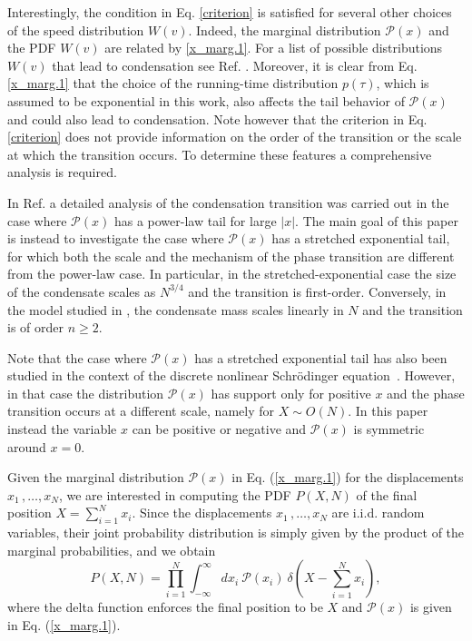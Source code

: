 \documentclass[aps,pre,twocolumn,superscriptaddress,showpacs]{revtex4-1}
\newcommand{\be}{\begin{equation}}
\newcommand{\ee}{\end{equation}}
\newcommand{\mP}{\mathcal{P}}
\begin{document}
Interestingly, the condition in Eq. \eqref{criterion} is satisfied for several other choices of the speed distribution $W(v)$. Indeed, the marginal distribution $\mP(x)$ and the PDF $W(v)$ are related by \eqref{x_marg.1}. For a list of possible distributions $W(v)$ that lead to condensation see Ref. \cite{MLDM21}. Moreover, it is clear from Eq. \eqref{x_marg.1} that the choice of the running-time distribution $p(\tau)$, which is assumed to be exponential in this work, also affects the tail behavior of $\mP(x)$ and could also lead to condensation. Note however that the criterion in Eq. \eqref{criterion} does not provide information on the order of the transition or the scale at which the transition occurs. To determine these features a comprehensive analysis is required.

In Ref. \cite{MLDM21} a detailed analysis of the condensation transition was carried out in the case where $\mP(x)$ has a power-law tail for large $|x|$. The main goal of this paper is instead to investigate the case where $\mP(x)$ has a stretched exponential tail, for which both the scale and the mechanism of the phase transition are different from the power-law case. In particular, in the stretched-exponential case the size of the condensate scales as $N^{3/4}$ and the transition is first-order. Conversely, in the model studied in \cite{MLDM21}, the condensate mass scales linearly in $N$ and the transition is of order $n\geq 2$.



Note that the case where $\mP(x)$ has a stretched exponential tail has also been studied in the context of the discrete nonlinear
Schr\"odinger equation~\cite{GIL21,GIL21b,GIP21}. However, in that case the distribution $\mP(x)$ has support only for positive $x$ and the phase transition occurs at a different scale, namely for $X\sim O(N)$. In this paper instead the variable $x$ can be positive or negative and $\mP(x)$ is symmetric around $x=0$.


Given the marginal distribution $\mP(x)$ in Eq. (\ref{x_marg.1}) for the displacements $x_1\,,\ldots,x_N$, we are interested in computing the PDF $P(X,N)$ of the final position $X=\sum_{i=1}^N x_i$. Since the displacements $x_1\,,\ldots,x_N$ are i.i.d. random variables, their joint probability distribution is simply given by the product of the marginal probabilities, and we obtain
\be
P(X,N) =  \prod_{i=1}^N \int_{-\infty}^{\infty}
dx_i~\mP(x_i)~\delta\left(X-\sum_{i=1}^N x_i\right),
\label{eq:PXN-free}
\ee
where the delta function enforces the final position to be $X$ and $\mP(x)$ is given in Eq. (\ref{x_marg.1}).
\end{document}
